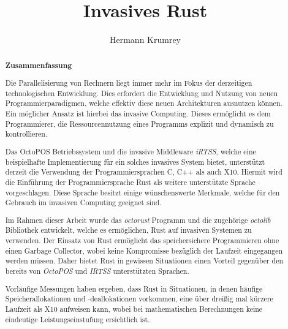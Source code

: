 \documentclass[parskip=full,12pt,a4paper,twoside,headings=openright]{scrreprt}
\title{Invasives Rust}
\author{Hermann Krumrey}
\begin{document}
\begin{otherlanguage}{ngerman} %
\mytitlepage
\end{otherlanguage}

\begin{abstract}
\begin{center}\Huge\textbf{\textsf{Zusammenfassung}}
\end{center}
\vfill

Die Parallelisierung von Rechnern liegt immer mehr im Fokus der derzeitigen technologischen Entwicklung.
Dies erfordert die Entwicklung und Nutzung von neuen Programmierparadigmen, welche effektiv
diese neuen Architekturen ausnutzen können. Ein möglicher Ansatz ist hierbei das
invasive Computing. Dieses ermöglicht es dem Programmierer, die Ressourcennutzung
eines Programms explizit und dynamisch zu kontrollieren.

Das OctoPOS Betriebssystem und die invasive Middleware \textit{iRTSS},
welche eine beispielhafte Implementierung für ein solches
invasives System bietet, unterstützt derzeit die Verwendung der Programmiersprachen
C, C++ als auch X10. Hiermit wird die Einführung der Programmiersprache Rust als
weitere unterstützte Sprache vorgeschlagen. Diese Sprache besitzt einige wünschenswerte Merkmale, 
welche für den Gebrauch im invasiven Computing geeignet sind.

Im Rahmen dieser Arbeit wurde das \textit{octorust} Programm und die zugehörige \textit{octolib} Bibliothek
entwickelt, welche es ermöglichen, Rust auf invasiven Systemen zu verwenden. Der Einsatz von Rust
ermöglicht das speichersichere Programmieren ohne einen Garbage Collector, wobei keine Kompromisse bezüglich
der Laufzeit eingegangen werden müssen. Daher bietet Rust in gewissen Situationen einen
Vorteil gegenüber den bereits von \textit{OctoPOS} und \textit{IRTSS} unterstützten Sprachen.

Vorläufige Messungen haben ergeben, dass Rust in Situationen, in denen häufige Speicherallokationen und
-deallokationen vorkommen, eine über dreißig mal kürzere Laufzeit als X10 aufweisen kann, wobei bei mathematischen
Berechnungen keine eindeutige Leistungseinstufung ersichtlich ist.

\vfill

\end{abstract}

\tableofcontents






\end{document}
